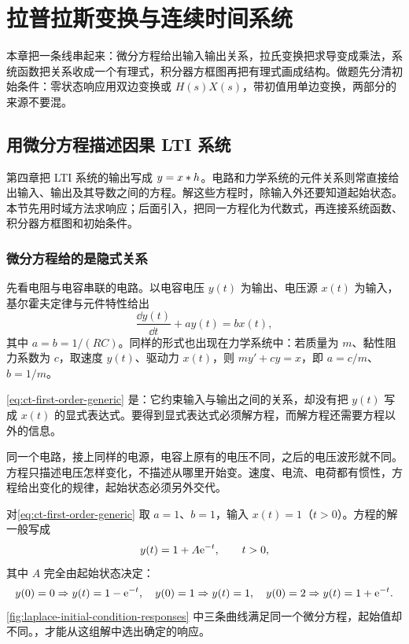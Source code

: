 \begingroup
\raggedbottom

\chapter{拉普拉斯变换与连续时间系统}
\label{chap:laplace-transform}

本章把一条线串起来：微分方程给出输入输出关系，拉氏变换把求导变成乘法，系统函数把关系收成一个有理式，积分器方框图再把有理式画成结构。做题先分清初始条件：零状态响应用双边变换或 $H(s)X(s)$，带初值用单边变换，两部分的来源不要混。

\section{用微分方程描述因果 LTI 系统}
\label{sec:ct-differential-equation}

第四章把 LTI 系统的输出写成 $y=x\mathbin{\ast} h$。电路和力学系统的元件关系则常直接给出输入、输出及其导数之间的方程。解这些方程时，除输入外还要知道起始状态。本节先用时域方法求响应；后面引入，把同一方程化为代数式，再连接系统函数、积分器方框图和初始条件。

\subsection{微分方程给的是隐式关系}

先看电阻与电容串联的电路。以电容电压 $y(t)$ 为输出、电压源 $x(t)$ 为输入，基尔霍夫定律与元件特性给出
\begin{equation}
  \frac{\dd y(t)}{\dd t}+ay(t)=bx(t),
  \label{eq:ct-first-order-generic}
\end{equation}
其中 $a=b=1/(RC)$。同样的形式也出现在力学系统中：若质量为 $m$、黏性阻力系数为 $c$，取速度 $y(t)$、驱动力 $x(t)$，则 $my'+cy=x$，即 $a=c/m$、$b=1/m$。

\cref{eq:ct-first-order-generic} 是：它约束输入与输出之间的关系，却没有把 $y(t)$ 写成 $x(t)$ 的显式表达式。要得到显式表达式必须解方程，而解方程还需要方程以外的信息。

\begin{intuition}[为什么一个方程不够]
  同一个电路，接上同样的电源，电容上原有的电压不同，之后的电压波形就不同。方程只描述电压怎样变化，不描述从哪里开始变。速度、电流、电荷都有惯性，方程给出变化的规律，起始状态必须另外交代。
\end{intuition}

\begin{example}[同一方程的三种结果]
  对\cref{eq:ct-first-order-generic} 取 $a=1$、$b=1$，输入 $x(t)=1$（$t>0$）。方程的解一般写成
  \[
    y(t)=1+A\mathrm{e}^{-t},\qquad t>0,
  \]
  其中 $A$ 完全由起始状态决定：
  \[
    y(0)=0\Rightarrow y(t)=1-\mathrm{e}^{-t},
    \quad
    y(0)=1\Rightarrow y(t)=1,
    \quad
    y(0)=2\Rightarrow y(t)=1+\mathrm{e}^{-t}.
  \]
  \cref{fig:laplace-initial-condition-responses} 中三条曲线满足同一个微分方程，起始值却不同。，才能从这组解中选出确定的响应。
\end{example}

